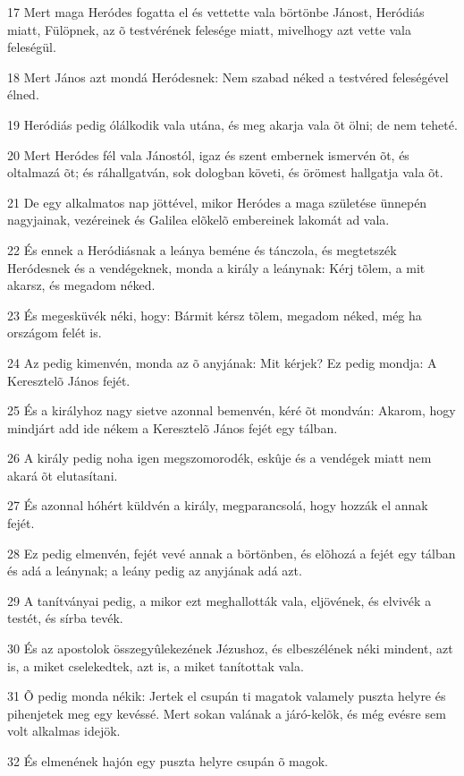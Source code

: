 \par 17 Mert maga Heródes fogatta el és vettette vala börtönbe Jánost, Heródiás miatt, Fülöpnek, az õ testvérének felesége miatt, mivelhogy azt vette vala feleségül.
\par 18 Mert János azt mondá Heródesnek: Nem szabad néked a testvéred feleségével élned.
\par 19 Heródiás pedig ólálkodik vala utána, és meg akarja vala õt ölni; de nem teheté.
\par 20 Mert Heródes fél vala Jánostól, igaz és szent embernek ismervén õt, és oltalmazá õt; és ráhallgatván, sok dologban követi, és örömest hallgatja vala õt.
\par 21 De egy alkalmatos nap jöttével, mikor Heródes a maga születése ünnepén nagyjainak, vezéreinek és Galilea elõkelõ embereinek lakomát ad vala.
\par 22 És ennek a Heródiásnak a leánya beméne és tánczola, és megtetszék Heródesnek és a vendégeknek, monda a király a leánynak: Kérj tõlem, a mit akarsz, és megadom néked.
\par 23 És megesküvék néki, hogy: Bármit kérsz tõlem, megadom néked, még ha országom felét is.
\par 24 Az pedig kimenvén, monda az õ anyjának: Mit kérjek? Ez pedig mondja: A Keresztelõ János fejét.
\par 25 És a királyhoz nagy sietve azonnal bemenvén, kéré õt mondván: Akarom, hogy mindjárt add ide nékem a Keresztelõ János fejét egy tálban.
\par 26 A király pedig noha igen megszomorodék, eskûje és a vendégek miatt nem akará õt elutasítani.
\par 27 És azonnal hóhért küldvén a király, megparancsolá, hogy hozzák el annak fejét.
\par 28 Ez pedig elmenvén, fejét vevé annak a börtönben, és elõhozá a fejét egy tálban és adá a leánynak; a leány pedig az anyjának adá azt.
\par 29 A tanítványai pedig, a mikor ezt meghallották vala, eljövének, és elvivék a testét, és sírba tevék.
\par 30 És az apostolok összegyûlekezének Jézushoz, és elbeszélének néki mindent, azt is, a miket cselekedtek, azt is, a miket tanítottak vala.
\par 31 Õ pedig monda nékik: Jertek el csupán ti magatok valamely puszta helyre és pihenjetek meg egy kevéssé. Mert sokan valának a járó-kelõk, és még evésre sem volt alkalmas idejök.
\par 32 És elmenének hajón egy puszta helyre csupán õ magok.
